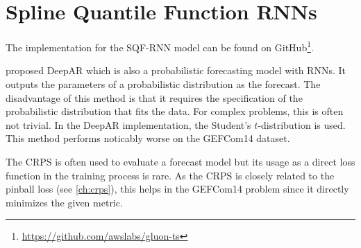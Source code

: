 \section{Spline Quantile Function RNNs}
\label{sec:implementation-sqf-rnn}

The implementation for the SQF-RNN model can be found on GitHub\footnote{\url{https://github.com/awslabs/gluon-ts}}.

\Textcite{Salinas2017} proposed DeepAR which is also a 
probabilistic forecasting model with RNNs. It outputs the 
parameters of a probabilistic distribution as the forecast. 
The disadvantage of this method is that it requires the 
specification of the probabilistic distribution that fits the data. 
For complex problems, this is often not trivial. 
In the DeepAR implementation, the Student's \(t\)-distribution is used. 
This method performs noticably worse on the GEFCom14 dataset. 

The CRPS is often used to evaluate a forecast model but its usage as 
a direct loss function in the training process is rare. 
As the CRPS is closely related to the pinball loss (see \ref{ch:crps}), 
this helps in the GEFCom14 problem since it directly minimizes the given metric.